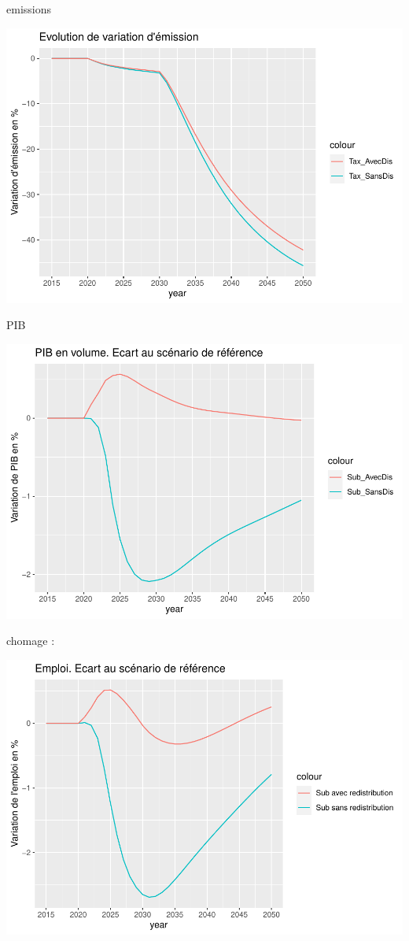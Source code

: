 \documentclass[
]{article}
\begin{document}
emissions

\begin{center}\includegraphics[width=0.7\linewidth,height=0.7\textheight]{Modele-ThreeMe-Tunisie_Sequeira_Valilou_Wang_files/figure-latex/unnamed-chunk-10-1} \end{center}

PIB

\begin{center}\includegraphics[width=0.7\linewidth,height=0.7\textheight]{Modele-ThreeMe-Tunisie_Sequeira_Valilou_Wang_files/figure-latex/unnamed-chunk-11-1} \end{center}

chomage :

\begin{center}\includegraphics[width=0.7\linewidth,height=0.7\textheight]{Modele-ThreeMe-Tunisie_Sequeira_Valilou_Wang_files/figure-latex/unnamed-chunk-12-1} \end{center}
\end{document}
